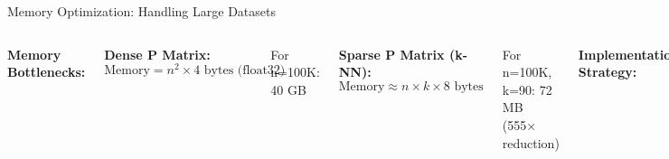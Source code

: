 \documentclass[aspectratio=169]{beamer}
\begin{document}
\begin{frame}{Memory Optimization: Handling Large Datasets}
\begin{columns}
\textbf{Memory Bottlenecks:}

\textbf{Dense P Matrix:}
$\text{Memory} = n^2 \times 4\text{ bytes (float32)}$

For n=100K: 40 GB

\textbf{Sparse P Matrix (k-NN):}
$\text{Memory} \approx n \times k \times 8\text{ bytes}$

For n=100K, k=90: 72 MB (555× reduction)

\textbf{Implementation Strategy:}

\begin{enumerate}
\item Compute k-nearest neighbors
\item Store only non-zero $p_{ij}$ (sparse)
\item Use compressed sparse row (CSR) format
\item Batch gradient computation
\item Memory-mapped intermediate arrays
\end{enumerate}

\textbf{Additional Optimizations:}

\begin{itemize}
\item Use float32 not float64 (2× savings)
\item Compute distances in chunks
\item Stream data from disk if needed
\item Leverage GPU memory (if available)
\end{itemize}

\end{columns}
\end{frame}
\end{document}
